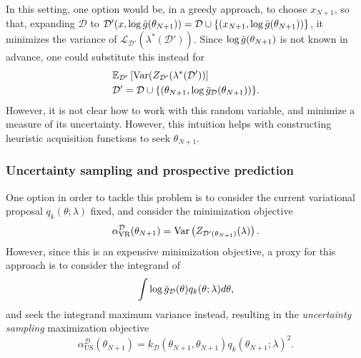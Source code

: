 In this setting, one option would be, in a greedy approach, to choose $x_{N+1}$, so that, expanding $\mathcal{D}$ to $\mathcal{D}'(x,\log {\bar{g}}(\theta_{N+1})) = \mathcal{D} \cup \{(x_{N+1},\log {\bar{g}}(\theta_{N+1}))\}$, it minimizes the variance of $\mathcal{L}_{\mathcal{D'}}(\lambda^*(\mathcal{D'}))$. Since $\log {\bar{g}}(\theta_{N+1})$ is not known in advance, one could substitute this instead for
\begin{equation}
\begin{split}
 & {\mathbb E}_\mathcal{D'} \left[ \mathrm{Var}(Z_{\mathcal{D'}}(\lambda^*(\mathcal{D'})) \right] \\
 & \mathcal{D}' = \mathcal{D} \cup \{(\theta_{N+1},\log {\bar{g}}_\mathcal{D}(\theta_{N+1}))\}.
 \end{split}
\end{equation}
However, it is not clear how to work with this random variable, and minimize a measure of its uncertainty. However, this intuition helps with constructing heuristic acquisition functions to seek $\theta_{N+1}$.

\subsubsection{Uncertainty sampling and prospective prediction}
One option in order to tackle this problem is to consider the current variational proposal $q_k(\theta;\lambda)$ fixed, and consider the minimization objective
\begin{equation} 
 \alpha^\mathcal{D}_\text{VR}(\theta_{N+1}) = \mathrm{Var}\left(Z_{\mathcal{D}'(\theta_{N+1})}(\lambda)\right).
\end{equation}
However, since this is an expensive minimization objective, a proxy for this approach is to consider the integrand of
\begin{displaymath}
 \int \log {\bar{g}}_\mathcal{D}(\theta) q_k(\theta;\lambda) d\theta,
\end{displaymath}
and seek the integrand maximum variance instead, resulting in the \textit{uncertainty sampling} maximization objective
\begin{equation}\label{us_vbmc}
 \alpha^\mathcal{D}_{\text{US}}(\theta_{N+1}) = k_\mathcal{D}(\theta_{N+1},\theta_{N+1}) q_k(\theta_{N+1};\lambda)^2.
\end{equation}

